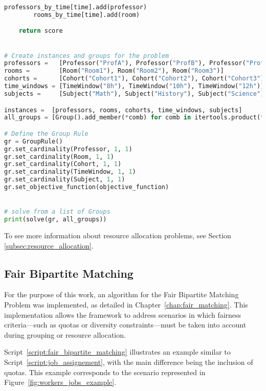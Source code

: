 \begin{lstlisting}[language=Python, caption={Creating and solving the Timetable Scheduling Problem using this framework.}, label={script:time_table}]
        professors_by_time[time].add(professor)
        rooms_by_time[time].add(room)

    return score


# Create instances and groups for the problem
professors =   [Professor("ProfA"), Professor("ProfB"), Professor("ProfC")]
rooms =        [Room("Room1"), Room("Room2"), Room("Room3")]
cohorts =      [Cohort("Cohort1"), Cohort("Cohort2"), Cohort("Cohort3")]
time_windows = [TimeWindow("8h"), TimeWindow("10h"), TimeWindow("12h")]
subjects =     [Subject("Math"), Subject("History"), Subject("Science")]

instances =  [professors, rooms, cohorts, time_windows, subjects]
all_groups = [Group().add_member(*comb) for comb in itertools.product(*instances)]

# Define the Group Rule
gr = GroupRule()
gr.set_cardinality(Professor, 1, 1)
gr.set_cardinality(Room, 1, 1)
gr.set_cardinality(Cohort, 1, 1)
gr.set_cardinality(TimeWindow, 1, 1)
gr.set_cardinality(Subject, 1, 1)
gr.set_objective_function(objective_function)


# solve from a list of Groups
print(solve(gr, all_groups))
\end{lstlisting}

To see more information about resource allocation problems, see Section \ref{subsec:resource_allocation}.


\subsection{Fair Bipartite Matching}

For the purpose of this work, an algorithm for the Fair Bipartite Matching Problem was implemented, as detailed in Chapter~\ref{chap:fair_matching}.  
This implementation allows the framework to address scenarios in which fairness criteria—such as quotas or diversity constraints—must be taken into account during grouping or resource allocation.

Script~\ref{script:fair_bipartite_matching} illustrates an example similar to Script~\ref{script:job_assignement}, with the main difference being the inclusion of quotas.  
This example corresponds to the scenario represented in Figure~\ref{fig:workers_jobs_example}.


